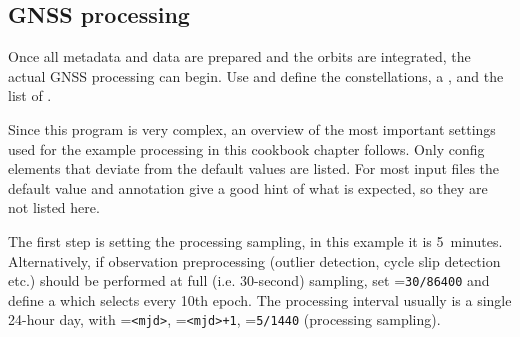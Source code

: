 \subsection{GNSS processing}\label{cookbook.gnssNetwork:processing}

Once all metadata and data are prepared and the orbits are integrated, the actual GNSS processing can begin.
Use  and define the 
constellations, a , and
the list of .

Since this program is very complex, an overview of the most important settings used for the example
processing in this cookbook chapter follows. Only config elements that deviate from the default values are listed.
For most input files the default value and annotation give a good hint of what is expected, so they are not
listed here.

The first step is setting the processing sampling, in this example it is 5~minutes. Alternatively, if observation
preprocessing (outlier detection, cycle slip detection etc.) should be performed at full (i.e. 30-second) sampling,
set =\verb|30/86400| and define a 
which selects every 10th epoch. The processing interval usually is a single 24-hour day,
 with =\verb|<mjd>|,
=\verb|<mjd>+1|, =\verb|5/1440| (processing sampling).

